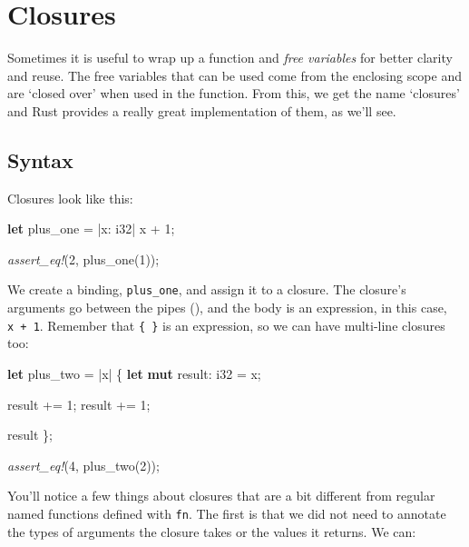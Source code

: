 \documentclass[a4paper,]{book}
\renewcommand*{\hypertarget}[3][\ar]{%
  \def\ar{#2}%
  \label{#1}%
  #3}
\newenvironment{Shaded}{\begin{snugshade}}{\end{snugshade}}
\newcommand{\KeywordTok}[1]{\textcolor[rgb]{0.13,0.29,0.53}{\textbf{{#1}}}}
\newcommand{\DataTypeTok}[1]{\textcolor[rgb]{0.13,0.29,0.53}{{#1}}}
\newcommand{\DecValTok}[1]{\textcolor[rgb]{0.00,0.00,0.81}{{#1}}}
\newcommand{\PreprocessorTok}[1]{\textcolor[rgb]{0.56,0.35,0.01}{\textit{{#1}}}}
\newcommand{\NormalTok}[1]{{#1}}
\begin{document}
\hypertarget{sec--closures}{\section{Closures}\label{sec--closures}}

Sometimes it is useful to wrap up a function and \emph{free variables}
for better clarity and reuse. The free variables that can be used come
from the enclosing scope and are `closed over' when used in the
function. From this, we get the name `closures' and Rust provides a
really great implementation of them, as we'll see.

\subsection{Syntax}\label{syntax}

Closures look like this:

\begin{Shaded}
\begin{Highlighting}[]
\KeywordTok{let} \NormalTok{plus_one = |x: }\DataTypeTok{i32}\NormalTok{| x + }\DecValTok{1}\NormalTok{;}

\PreprocessorTok{assert_eq!}\NormalTok{(}\DecValTok{2}\NormalTok{, plus_one(}\DecValTok{1}\NormalTok{));}
\end{Highlighting}
\end{Shaded}

We create a binding, \texttt{plus\_one}, and assign it to a closure. The
closure's arguments go between the pipes (\texttt{\textbar{}}), and the
body is an expression, in this case, \texttt{x\ +\ 1}. Remember that
\texttt{\{\ \}} is an expression, so we can have multi-line closures
too:

\begin{Shaded}
\begin{Highlighting}[]
\KeywordTok{let} \NormalTok{plus_two = |x| \{}
    \KeywordTok{let} \KeywordTok{mut} \NormalTok{result: }\DataTypeTok{i32} \NormalTok{= x;}

    \NormalTok{result += }\DecValTok{1}\NormalTok{;}
    \NormalTok{result += }\DecValTok{1}\NormalTok{;}

    \NormalTok{result}
\NormalTok{\};}

\PreprocessorTok{assert_eq!}\NormalTok{(}\DecValTok{4}\NormalTok{, plus_two(}\DecValTok{2}\NormalTok{));}
\end{Highlighting}
\end{Shaded}

You'll notice a few things about closures that are a bit different from
regular named functions defined with \texttt{fn}. The first is that we
did not need to annotate the types of arguments the closure takes or the
values it returns. We can:
\end{document}
